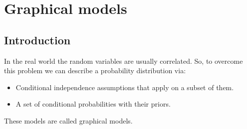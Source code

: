 \documentclass[12pt, a4paper]{report}
\begin{document}
\newpage

\chapter{Graphical models}
    \section{Introduction}
    In the real world the random variables are usually correlated. So, to overcome this problem we can describe a probability distribution via: 
    \begin{itemize}
        \item Conditional independence assumptions that apply on a subset of them. 
        \item A set of conditional probabilities with their priors. 
    \end{itemize}
    These models are called graphical models. 
\end{document}
